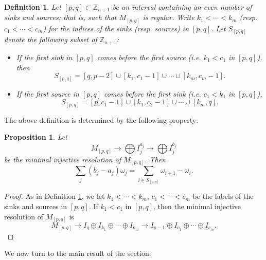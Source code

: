 \documentclass[12pt]{amsart}
\newcommand{\ZZ}{\mathbb{Z}}
\newtheorem{definition}[theorem]{Definition}
\newtheorem{proposition}[theorem]{Proposition}
\numberwithin{equation}{section}
\begin{document}
\begin{definition}\label{def:Spq}
Let $[p,q] \subset \ZZ_{n+1}$ be an interval containing an even number of sinks and sources; that is, such that $M_{[p,q]}$ is regular. Write $k_1 < \cdots < k_m$ (resp. $c_1 < \cdots < c_m$) for the indices of the sinks (resp. sources) in $[p,q]$. Let $S_{[p,q]}$ denote the following subset of $\ZZ_{n+1}$:
\begin{itemize}
\item If the first sink in $[p,q]$ comes before the first source (i.e. $k_1 < c_1$ in $[p,q]$), then 
\[
S_{[p,q]} = [q,p-2] \cup [k_1, c_1 -1] \cup \cdots \cup [k_m, c_m - 1].
\]
\item If the first source in $[p,q]$ comes before the first sink (i.e. $c_1 < k_1$ in $[p,q]$),
\[
S_{[p,q]} = [p,c_1-1] \cup [k_1,c_2-1] \cup \cdots \cup [k_m,q].
\]
\end{itemize}
\end{definition}

The above definition is determined by the following property:
\begin{proposition}
Let 
\[
M_{[p,q]} \to \bigoplus I_j^{a_j} \to \bigoplus I_j^{b_j}
\]
be the minimal injective resolution of $M_{[p,q]}$. Then
\[
\sum_j (b_j - a_j)\omega_j = \sum_{i \in S_{[p,q]}} \omega_{i+1} - \omega_i.
\]
\end{proposition}
\begin{proof}
As in Definition \ref{def:Spq}, we let $k_1 < \cdots < k_m$, $c_1 < \cdots < c_m$ be the labels of the sinks and sources in $[p,q]$. If $k_1 < c_1$ in $[p,q]$, then the minimal injective resolution of $M_{[p,q]}$ is
\[
M_{[p,q]} \to I_q \oplus I_{k_1} \oplus \cdots \oplus I_{k_m} \to I_{p-1} \oplus I_{c_1} \oplus \cdots \oplus I_{c_m}.
\]
\end{proof}

We now turn to the main result of the section:
\end{document}
